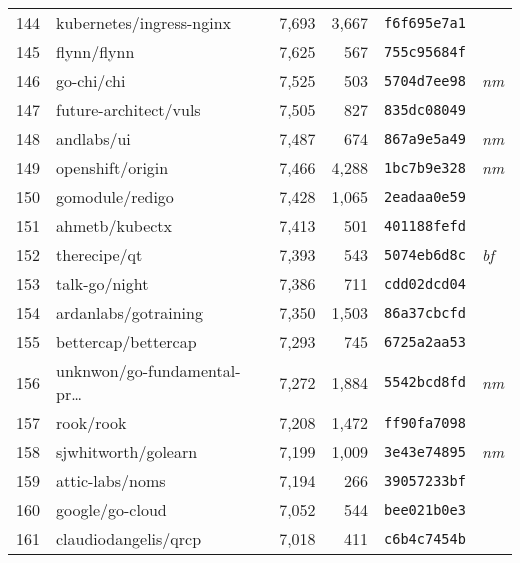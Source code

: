 {\begin{supertabular}{llrrll}
        144 &           kubernetes/ingress-nginx &  7,693 &  3,667 &  \texttt{f6f695e7a1} &              \\
        145 &                        flynn/flynn &  7,625 &    567 &  \texttt{755c95684f} &              \\
        146 &                         go-chi/chi &  7,525 &    503 &  \texttt{5704d7ee98} &  \textit{nm} \\
        147 &              future-architect/vuls &  7,505 &    827 &  \texttt{835dc08049} &              \\
        148 &                         andlabs/ui &  7,487 &    674 &  \texttt{867a9e5a49} &  \textit{nm} \\
        149 &                   openshift/origin &  7,466 &  4,288 &  \texttt{1bc7b9e328} &  \textit{nm} \\
        150 &                    gomodule/redigo &  7,428 &  1,065 &  \texttt{2eadaa0e59} &              \\
        151 &                     ahmetb/kubectx &  7,413 &    501 &  \texttt{401188fefd} &              \\
        152 &                       therecipe/qt &  7,393 &    543 &  \texttt{5074eb6d8c} &  \textit{bf} \\
        153 &                      talk-go/night &  7,386 &    711 &  \texttt{cdd02dcd04} &              \\
        154 &               ardanlabs/gotraining &  7,350 &  1,503 &  \texttt{86a37cbcfd} &              \\
        155 &                bettercap/bettercap &  7,293 &    745 &  \texttt{6725a2aa53} &              \\
        156 &    unknwon/go-fundamental-pr\ldots &  7,272 &  1,884 &  \texttt{5542bcd8fd} &  \textit{nm} \\
        157 &                          rook/rook &  7,208 &  1,472 &  \texttt{ff90fa7098} &              \\
        158 &                sjwhitworth/golearn &  7,199 &  1,009 &  \texttt{3e43e74895} &  \textit{nm} \\
        159 &                    attic-labs/noms &  7,194 &    266 &  \texttt{39057233bf} &              \\
        160 &                    google/go-cloud &  7,052 &    544 &  \texttt{bee021b0e3} &              \\
        161 &               claudiodangelis/qrcp &  7,018 &    411 &  \texttt{c6b4c7454b} &              \\

\end{supertabular}}
